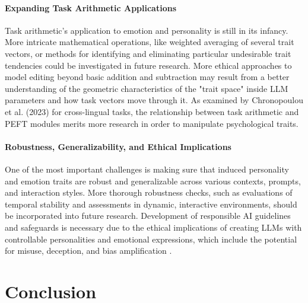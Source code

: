 \documentclass{DESSThesis}
\begin{document}
\subsubsection{Expanding Task Arithmetic Applications}
Task arithmetic's application to emotion and personality is still in its infancy. More intricate mathematical operations, like weighted averaging of several trait vectors, or methods for identifying and eliminating particular undesirable trait tendencies could be investigated in future research. More ethical approaches to model editing beyond basic addition and subtraction may result from a better understanding of the geometric characteristics of the "trait space" inside LLM parameters and how task vectors move through it. As examined by Chronopoulou et al. (2023) for cross-lingual tasks, the relationship between task arithmetic and PEFT modules merits more research in order to manipulate psychological traits.

\subsubsection{Robustness, Generalizability, and Ethical Implications}
One of the most important challenges is making sure that induced personality and emotion traits are robust and generalizable across various contexts, prompts, and interaction styles. More thorough robustness checks, such as evaluations of temporal stability and assessments in dynamic, interactive environments, should be incorporated into future research. Development of responsible AI guidelines and safeguards is necessary due to the ethical implications of creating LLMs with controllable personalities and emotional expressions, which include the potential for misuse, deception, and bias amplification \cite{safdari_personality_2023, chang_modeling_2024}.


\chapter{Conclusion}
\thispagestyle{empty}
\end{document}
